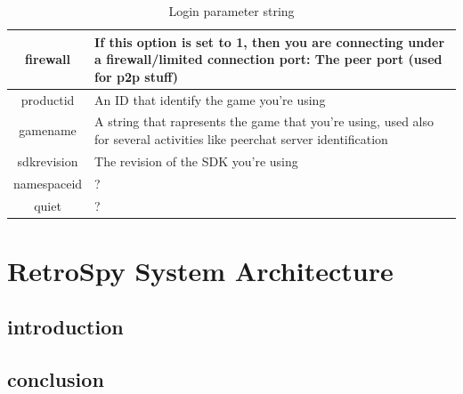 \documentclass[oneside,titlepage,a4paper]{report} %
\begin{document}
\begin{table}[H]
\begin{tabular}{|c|p{9cm}|}
		 firewall   & If this option is set to 1, then you are connecting under a firewall/limited connection port: The peer port (used for p2p stuff)                                                                          \\ \hline
		 productid  & An ID that identify the game you're using                                                                                                                                                                 \\ \hline
		 gamename   & A string that rapresents the game that you're using, used also for several activities like peerchat server identification                                                                                 \\ \hline
		sdkrevision & The revision of the SDK you're using                                                                                                                                                                      \\ \hline
		namespaceid & ?                                                                                                                                                                                                         \\ \hline
		   quiet    & ?                                                                                                                                                                                                         \\ \hline
	\end{tabular} 
	\caption{Login parameter string}
	\label{Login parameter string}
\end{table}



\part{RetroSpy System Architecture}


\chapter{introduction}

\chapter{conclusion}
\end{document}

